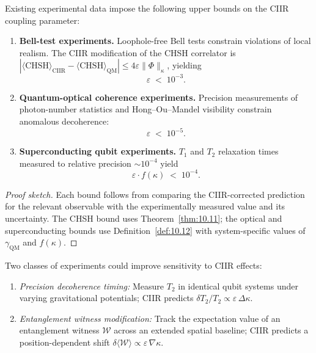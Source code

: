 \begin{theorem}
\label{thm:10.12}
Existing experimental data impose the following upper bounds on the
CIIR coupling parameter:
\begin{enumerate}
  \item \textbf{Bell-test experiments.}  Loophole-free Bell tests
        constrain violations of local realism.  The CIIR modification
        of the CHSH correlator is
        $|\langle\mathrm{CHSH}\rangle_{\mathrm{CIIR}}
         -\langle\mathrm{CHSH}\rangle_{\mathrm{QM}}|
         \leq 4\varepsilon\|\Phi\|_{\kappa}$,
        yielding
        \begin{equation}
          \varepsilon \;<\; 10^{-3}.
        \end{equation}
  \item \textbf{Quantum-optical coherence experiments.}  Precision
        measurements of photon-number statistics and Hong--Ou--Mandel
        visibility constrain anomalous decoherence:
        \begin{equation}
          \varepsilon \;<\; 10^{-5}.
        \end{equation}
  \item \textbf{Superconducting qubit experiments.}  $T_1$ and $T_2$
        relaxation times measured to relative precision
        $\sim 10^{-4}$ yield
        \begin{equation}
          \varepsilon\cdot f(\kappa) \;<\; 10^{-4}.
        \end{equation}
\end{enumerate}
\end{theorem}

\begin{proof}[Proof sketch]
Each bound follows from comparing the CIIR-corrected prediction for
the relevant observable with the experimentally measured value and
its uncertainty.  The CHSH bound uses
Theorem~\ref{thm:10.11}; the optical and superconducting bounds use
Definition~\ref{def:10.12} with system-specific values of
$\gamma_{\mathrm{QM}}$ and $f(\kappa)$.
\end{proof}

\begin{remark}
\label{rem:10.6}
Two classes of experiments could improve sensitivity to CIIR effects:
\begin{enumerate}
  \item \emph{Precision decoherence timing:} Measure $T_2$ in
        identical qubit systems under varying gravitational
        potentials; CIIR predicts $\delta T_2/T_2\propto
        \varepsilon\,\Delta\kappa$.
  \item \emph{Entanglement witness modification:} Track the
        expectation value of an entanglement witness
        $\mathcal{W}$ across an extended spatial baseline; CIIR
        predicts a position-dependent shift
        $\delta\langle\mathcal{W}\rangle\propto
        \varepsilon\,\nabla\kappa$.
\end{enumerate}
\end{remark}

